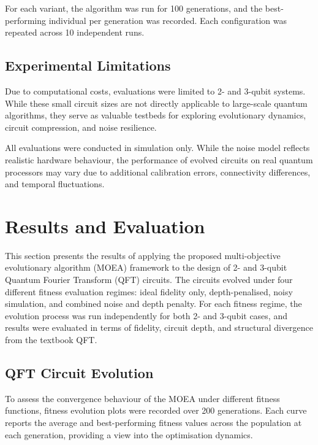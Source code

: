 \documentclass[11pt,a4paper]{article}
\begin{document}
For each variant, the algorithm was run for 100 generations, and the best-performing individual per generation was recorded. Each configuration was repeated across 10 independent runs.

\subsection{Experimental Limitations}
Due to computational costs, evaluations were limited to 2- and 3-qubit systems. While these small circuit sizes are not directly applicable to large-scale quantum algorithms, they serve as valuable testbeds for exploring evolutionary dynamics, circuit compression, and noise resilience.\newline

All evaluations were conducted in simulation only. While the noise model reflects realistic hardware behaviour, the performance of evolved circuits on real quantum processors may vary due to additional calibration errors, connectivity differences, and temporal fluctuations.


%
%
\section{Results and Evaluation}
This section presents the results of applying the proposed multi-objective evolutionary algorithm (MOEA) framework to the design of 2- and 3-qubit Quantum Fourier Transform (QFT) circuits. The circuits evolved under four different fitness evaluation regimes: ideal fidelity only, depth-penalised, noisy simulation, and combined noise and depth penalty. For each fitness regime, the evolution process was run independently for both 2- and 3-qubit cases, and results were evaluated in terms of fidelity, circuit depth, and structural divergence from the textbook QFT.

\subsection{QFT Circuit Evolution}
To assess the convergence behaviour of the MOEA under different fitness functions, fitness evolution plots were recorded over 200 generations. Each curve reports the average and best-performing fitness values across the population at each generation, providing a view into the optimisation dynamics.\newline
\end{document}
